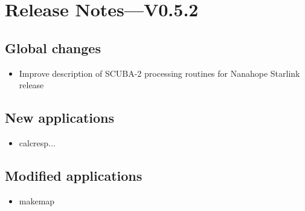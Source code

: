 \documentclass[twoside,11pt]{article}
\renewcommand{\_}{\texttt{\symbol{95}}}
\begin{document}
\section{Release Notes---V0.5.2}

\subsection{Global changes}
\begin{itemize}
\item Improve description of SCUBA-2 processing routines for Nanahope
  Starlink release
\end{itemize}

\subsection{New applications}
\begin{itemize}
  \item calcresp...
\end{itemize}

\subsection{Modified applications}
\begin{itemize}
  \item makemap
\end{itemize}
\end{document}
